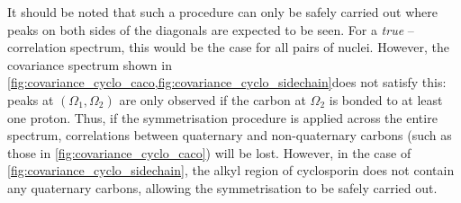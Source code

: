 \documentclass[a4paper,12pt]{article}
\newcommand{\carbon}{\ch{^{13}C}}
\begin{document}
\begin{refsection}
It should be noted that such a procedure can only be safely carried out where peaks on both sides of the diagonals are expected to be seen.
For a \textit{true} \carbon{}--\carbon{} correlation spectrum, this would be the case for all pairs of \carbon{} nuclei.
However, the covariance spectrum shown in \cref{fig:covariance_cyclo_caco,fig:covariance_cyclo_sidechain}does not satisfy this: peaks at $(\Omega_1, \Omega_2)$ are only observed if the carbon at $\Omega_2$ is bonded to at least one proton.
Thus, if the symmetrisation procedure is applied across the entire spectrum, correlations between quaternary and non-quaternary carbons (such as those in \cref{fig:covariance_cyclo_caco}) will be lost.
However, in the case of \cref{fig:covariance_cyclo_sidechain}, the alkyl region of cyclosporin does not contain any quaternary carbons, allowing the symmetrisation to be safely carried out.

\clearpage

\AtNextBibliography{\small}
\printbibliography{}
\clearpage    %

\end{refsection}
\end{document}
